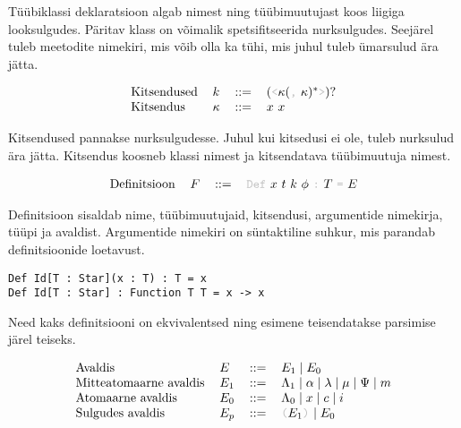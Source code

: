 \documentclass[12pt]{article}
\begin{document}
      Tüübiklassi deklaratsioon algab nimest ning tüübimuutujast koos liigiga looksulgudes. Päritav klass on võimalik spetsifitseerida nurksulgudes. Seejärel tuleb meetodite nimekiri, mis võib olla ka tühi, mis juhul tuleb ümarsulud ära jätta.

      \begin{equation*}
        \begin{tabular}{llll}
          Kitsendused & $k$      & $::=$ & $(${\color{helehall}\verb!<!}$\kappa(${\color{helehall}\verb!,!} $\kappa)^*${\color{helehall}\verb!>!}$)?$ \\
          Kitsendus   & $\kappa$ & $::=$ & $x$ $x$
        \end{tabular}
      \end{equation*}

      Kitsendused pannakse nurksulgudesse. Juhul kui kitsedusi ei ole, tuleb nurksulud ära jätta. Kitsendus koosneb klassi nimest ja kitsendatava tüübimuutuja nimest.

      \begin{equation*}
        \begin{tabular}{llll}
          Definitsioon & $F$ & $::=$ & {\color{helehall}\verb!Def!} $x$ $t$ $k$ $\phi$ {\color{helehall}\verb!:!} $T$ {\color{helehall}\verb!=!} $E$
        \end{tabular}
      \end{equation*}

      Definitsioon sisaldab nime, tüübimuutujaid, kitsendusi, argumentide nimekirja, tüüpi ja avaldist. Argumentide nimekiri on süntaktiline suhkur, mis parandab definitsioonide loetavust.

      \begin{verbatim}Def Id[T : Star](x : T) : T = x
Def Id[T : Star] : Function T T = x -> x\end{verbatim}

      Need kaks definitsiooni on ekvivalentsed ning esimene teisendatakse parsimise järel teiseks.

      \begin{equation*}
        \begin{tabular}{llll}
          Avaldis                & $E$   & $::=$ & $E_1\mid E_0$                                                           \\
          Mitteatomaarne avaldis & $E_1$ & $::=$ & $\Lambda_1\mid\alpha\mid\lambda\mid\mu\mid\Psi\mid m$                   \\
          Atomaarne avaldis      & $E_0$ & $::=$ & $\Lambda_0\mid x\mid c\mid i$                                           \\
          Sulgudes avaldis       & $E_p$ & $::=$ & {\color{helehall}\verb!(!}$E_1${\color{helehall}\verb!)!} $\mid E_0$
        \end{tabular}
      \end{equation*}
\end{document}
